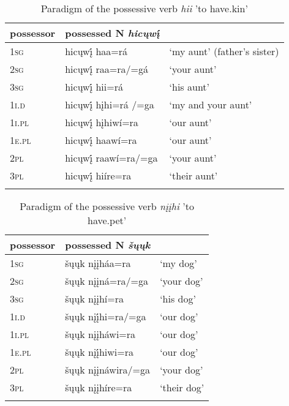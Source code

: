 \documentclass[output=paper]{LSP/langsci}
\begin{document}
\begin{table}
\caption{Paradigm of the possessive verb \textit{hii} 'to have.kin'} \label{havekin}
\begin{tabular}{ l l l }
\lsptoprule
possessor	& possessed N \textit{hicųwį́} &  \\
\midrule
\textsc{1sg}	& hicųwį́ haa=rá	 & `my aunt' (father's sister) \\
 
\textsc{2sg} & hicųwį́ raa=ra/=gá	& `your aunt' \\
 
\textsc{3sg} & hicųwį́ hii=rá	 & `his aunt' \\
 
\textsc{1i.d} & hicųwį́ hįhi=rá /=ga & `my and your aunt' \\
 
\textsc{1i.pl} & hicųwį́ hįhiwí=ra & `our  aunt' \\ 
 
\textsc{1e.pl} & hicųwį́ haawí=ra & `our aunt' \\
 
\textsc{2pl} & hicųwį́ raawí=ra/=ga & `your aunt'\\
 
\textsc{3pl} & hicųwį́ hiíre=ra & `their aunt' \\
\lspbottomrule 
\end{tabular}
\end{table}

\begin{table}
\caption{Paradigm of the possessive verb \textit{nįįhi} 'to have.pet'} \label{havepet}
\begin{tabularx}{.67\textwidth}{ lXl }
\lsptoprule
possessor	& possessed N \textit{šųųk} &  \\
\midrule	
\textsc{1sg} & šųųk nįįháa=ra & `my dog' \\
 
\textsc{2sg} & šųųk nįįná=ra/=ga & `your dog' \\
 
\textsc{3sg} & šųųk nįįhí=ra	& `his dog' \\
 
\textsc{1i.d} & šųųk nįį́hi=ra/=ga & `our dog' \\
 
\textsc{1i.pl} & šųųk nįįháwi=ra & `our  dog' \\
 
\textsc{1e.pl} & šųųk nįį́hiwi=ra & `our dog' \\
 
\textsc{2pl} & šųųk nįįnáwira/=ga & `your dog' \\
 
\textsc{3pl} & šųųk nįįhíre=ra & `their dog' \\
\lspbottomrule
\end{tabularx}
\end{table}
\end{document}
